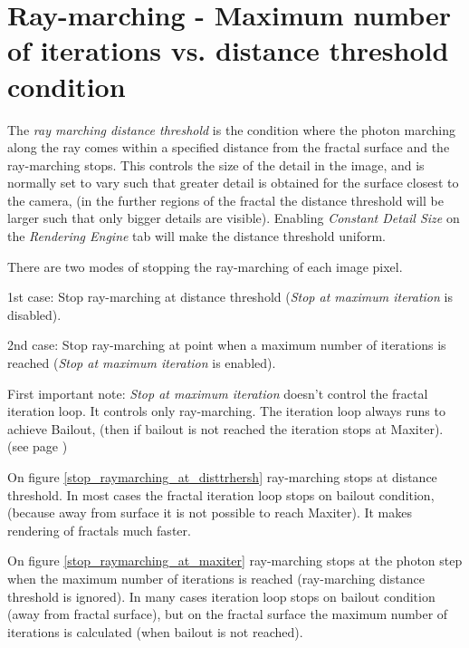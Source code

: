 \section{Ray-marching - Maximum number of iterations vs. distance threshold
	condition}\label{ray-marching---maximum-number-of-iterations-vs.-distance-threshold-condition}

The \emph{ray marching distance threshold} is the condition where the photon
marching along the ray comes within a specified distance from the fractal
surface and the ray-marching stops. This controls the size of the detail in the
image, and is normally set to vary such that greater detail is obtained for the
surface closest to the camera, (in the further regions of the fractal the
distance threshold will be larger such that only bigger details are visible).
Enabling \emph{Constant Detail Size} on the \emph{Rendering Engine} tab will
make the distance threshold uniform.

There are two modes of stopping the ray-marching of each image pixel.

1st case: Stop ray-marching at distance threshold (\emph{Stop at maximum
	iteration} is disabled).

2nd case: Stop ray-marching at point when a maximum number of iterations is
reached (\emph{Stop at maximum iteration} is enabled).

First important note: \emph{Stop at maximum iteration} doesn't control the
fractal iteration loop. It controls only ray-marching. The iteration loop always
runs to achieve Bailout, (then if bailout is not reached the iteration stops at
Maxiter). (see page \pageref{bailout-maxiter})

On figure \ref{stop_raymarching_at_disttrhersh} ray-marching stops at distance threshold. In most cases the fractal iteration
loop stops on bailout condition, (because away from surface it is not possible
to reach Maxiter). It makes rendering of fractals much faster.

On figure \ref{stop_raymarching_at_maxiter} ray-marching stops at the photon step when the maximum number of iterations is
reached (ray-marching distance threshold is ignored). In many cases iteration
loop stops on bailout condition (away from fractal surface), but on the fractal
surface the maximum number of iterations is calculated (when bailout is not
reached).

